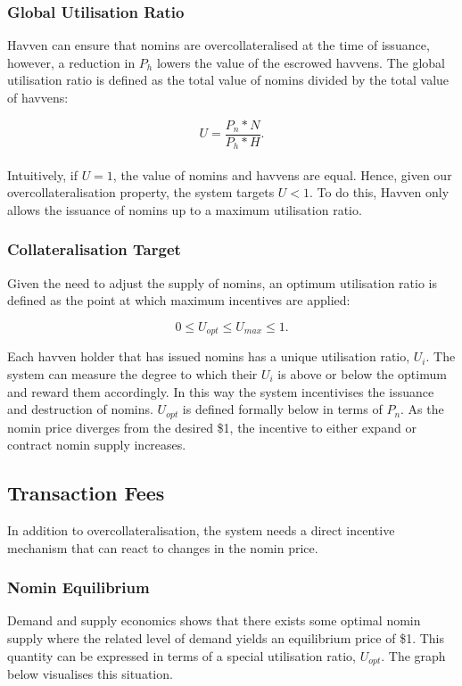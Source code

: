\newpage

\subsubsection{Global Utilisation Ratio}

\noindent Havven can ensure that nomins are overcollateralised at the time of issuance, however, a reduction in $P_h$ lowers the value of the escrowed havvens. The global utilisation ratio is defined as the total value of nomins divided by the total value of havvens:

$$ U = \frac{P_n * N}{P_h * H}.$$ \\

\noindent Intuitively, if $U = 1$, the value of nomins and havvens are equal. Hence, given our overcollateralisation property, the system targets $U <  1$. To do this, Havven only allows the issuance of nomins up to a maximum utilisation ratio.

\subsubsection{Collateralisation Target}

\noindent Given the need to adjust the supply of nomins, an optimum utilisation ratio is defined as the point at which maximum incentives are applied:

$$ 0 \leq U_{opt} \leq U_{max} \leq 1.$$

\noindent Each havven holder that has issued nomins has a unique utilisation ratio, $ U_i $. The system can measure the degree to which their $ U_i $ is above or below the optimum and reward them accordingly. In this way the system incentivises the issuance and destruction of nomins. $ U_{opt} $ is defined formally below in terms of $ P_n $. As  the nomin price diverges from the desired \$1, the incentive to either expand or contract nomin supply increases.

\newpage
\subsection{Transaction Fees} In addition to overcollateralisation, the system needs a direct incentive mechanism that can react to changes in the nomin price. 

\subsubsection{Nomin Equilibrium} Demand and supply economics shows that there exists some optimal nomin supply where the related level of demand yields an equilibrium price of \$1. This quantity can be expressed in terms of a special utilisation ratio, $U_{opt}$. The graph below visualises this situation. \\

